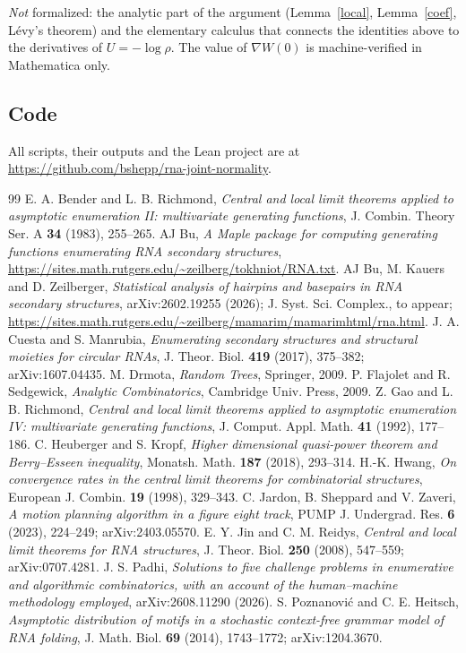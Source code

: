\documentclass[11pt]{amsart}
\theoremstyle{remark}
\begin{document}
\emph{Not} formalized: the analytic part of the argument (Lemma~\ref{local}, Lemma~\ref{coef}, L\'evy's theorem) and
the elementary calculus that connects the identities above to the derivatives of $U=-\log\rho$. The value of
$\nabla W(0)$ is machine-verified in Mathematica only.

\subsection*{Code} All scripts, their outputs and the Lean project are at
\url{https://github.com/bshepp/rna-joint-normality}.

\begin{thebibliography}{99}
 E. A. Bender and L. B. Richmond, \emph{Central and local limit theorems applied to asymptotic enumeration
II: multivariate generating functions}, J. Combin. Theory Ser. A \textbf{34} (1983), 255--265.
 AJ Bu, \emph{A Maple package for computing generating functions enumerating RNA secondary structures},
\url{https://sites.math.rutgers.edu/~zeilberg/tokhniot/RNA.txt}.
 AJ Bu, M. Kauers and D. Zeilberger, \emph{Statistical analysis of hairpins and basepairs in RNA
secondary structures}, arXiv:2602.19255 (2026); J. Syst. Sci. Complex., to appear;
\url{https://sites.math.rutgers.edu/~zeilberg/mamarim/mamarimhtml/rna.html}.
 J. A. Cuesta and S. Manrubia, \emph{Enumerating secondary structures and structural moieties for circular
RNAs}, J. Theor. Biol. \textbf{419} (2017), 375--382; arXiv:1607.04435.
 M. Drmota, \emph{Random Trees}, Springer, 2009.
 P. Flajolet and R. Sedgewick, \emph{Analytic Combinatorics}, Cambridge Univ. Press, 2009.
 Z. Gao and L. B. Richmond, \emph{Central and local limit theorems applied to asymptotic enumeration IV:
multivariate generating functions}, J. Comput. Appl. Math. \textbf{41} (1992), 177--186.
 C. Heuberger and S. Kropf, \emph{Higher dimensional quasi-power theorem and Berry--Esseen inequality},
Monatsh. Math. \textbf{187} (2018), 293--314.
 H.-K. Hwang, \emph{On convergence rates in the central limit theorems for combinatorial structures},
European J. Combin. \textbf{19} (1998), 329--343.
 C. Jardon, B. Sheppard and V. Zaveri, \emph{A motion planning algorithm in a figure eight track},
PUMP J. Undergrad. Res. \textbf{6} (2023), 224--249; arXiv:2403.05570.
 E. Y. Jin and C. M. Reidys, \emph{Central and local limit theorems for RNA structures}, J. Theor. Biol.
\textbf{250} (2008), 547--559; arXiv:0707.4281.
 J. S. Padhi, \emph{Solutions to five challenge problems in enumerative and algorithmic combinatorics, with
an account of the human--machine methodology employed}, arXiv:2608.11290 (2026).
 S. Poznanovi\'c and C. E. Heitsch, \emph{Asymptotic distribution of motifs in a stochastic context-free
grammar model of RNA folding}, J. Math. Biol. \textbf{69} (2014), 1743--1772; arXiv:1204.3670.
\end{thebibliography}
\end{document}
